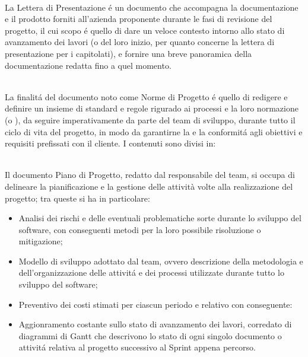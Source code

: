 \\
La Lettera di Presentazione é un documento che accompagna la documentazione e il prodotto forniti all'azienda proponente durante le fasi di revisione del progetto, il cui scopo é quello di dare un veloce contesto intorno allo stato di avanzamento dei lavori (o del loro inizio, per quanto concerne la lettera di presentazione per i capitolati), e fornire una breve panoramica della documentazione redatta fino a quel momento. 

\\
La finalitá del documento noto come Norme di Progetto é quello di redigere e definire un insieme di standard e regole rigurado ai processi e la loro normazione (o ), da seguire imperativamente da parte del team di sviluppo, durante tutto il ciclo di vita del progetto, in modo da garantirne la  e la conformitá agli obiettivi e requisiti prefissati con il cliente. I contenuti sono divisi in:

\\
Il documento Piano di Progetto, redatto dal responsabile del team, si occupa di delineare la pianificazione e la gestione delle attività volte alla realizzazione del progetto; tra queste si ha in particolare:
\begin{itemize}
    \item Analisi dei rischi e delle eventuali problematiche sorte durante lo sviluppo del software, con conseguenti metodi per la loro possibile risoluzione o mitigazione;
    \item Modello di sviluppo adottato dal team, ovvero descrizione della metodologia e dell'organizzazione delle attivitá e dei processi utilizzate durante tutto lo sviluppo del software; 
    \item Preventivo dei costi stimati per ciascun periodo e relativo  con conseguente:
    \item Aggionramento costante sullo stato di avanzamento dei lavori, corredato di diagrammi di Gantt che descrivono lo stato di ogni singolo documento o attivitá relativa al progetto successivo al Sprint appena percorso.
\end{itemize}

